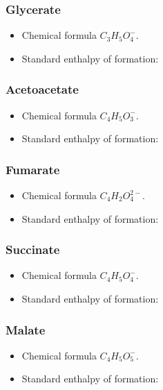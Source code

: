 \documentclass[a4paper,14pt]{extarticle}
\begin{document}
\subsubsection{Glycerate}
\begin{itemize}
    \item Chemical formula $C_3H_5O_4^-$.
    \item Standard enthalpy of formation:
\end{itemize}

\subsubsection{Acetoacetate}
\begin{itemize}
    \item Chemical formula $C_4H_5O_3^-$.
    \item Standard enthalpy of formation:
\end{itemize}

\subsubsection{Fumarate}
\begin{itemize}
    \item Chemical formula $C_4H_2O_4^{2-}$.
    \item Standard enthalpy of formation:
\end{itemize}

\subsubsection{Succinate}
\begin{itemize}
    \item Chemical formula $C_4H_5O_4^-$.
    \item Standard enthalpy of formation:
\end{itemize}

\subsubsection{Malate}
\begin{itemize}
    \item Chemical formula $C_4H_5O_5^-$.
    \item Standard enthalpy of formation:
\end{itemize}
\end{document}
